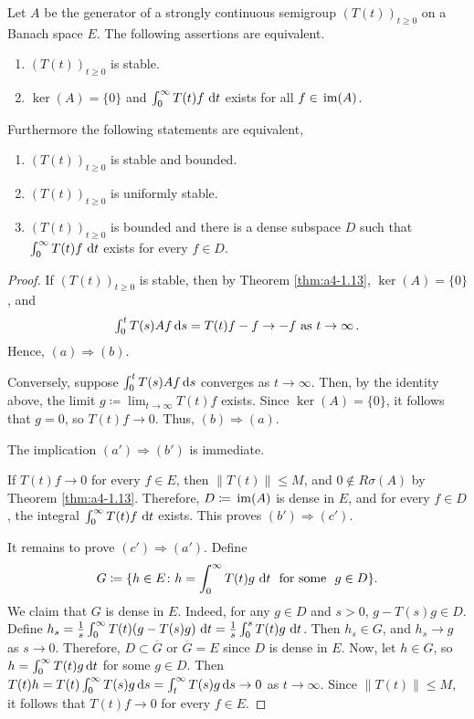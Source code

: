 \begin{theorem}\label{thm:a4-1.16}
Let $A$ be the generator of a strongly continuous semigroup $(T(t))_{t \geq 0}$ on a Banach space $E$. 
The following assertions are equivalent.
\begin{enumerate}[\upshape (a)]
\item 
$(T(t))_{t \geq 0}$ is stable.

\item 
$\ker(A) = \{0\}$ and $\int_{0}^{\infty} T(t)f \,\mathop{}\!\mathrm{d}{t}$ exists for all $f \in \mathop{}\mathrm{im}(A)$.

\end{enumerate}
Furthermore the following statements are equivalent,
\begin{enumerate}[(a')]
\item $(T(t))_{t \geq 0}$ is stable and bounded.
\item $(T(t))_{t \geq 0}$ is uniformly stable.
\item $(T(t))_{t \geq 0}$ is bounded and there is a dense subspace $D$ such that $\int_{0}^{\infty} T(t)f \,\mathop{}\!\mathrm{d}{t}$ exists for every $f \in D$.
\end{enumerate}
\end{theorem}

\begin{proof}
If $(T(t))_{t \geq 0}$ is stable, then by Theorem \ref{thm:a4-1.13}, $\ker(A) = \{0\}$, and
\[\textstyle{
\int_{0}^{t} T(s)Af  \mathop{}\!\mathrm{d}{s}= T(t)f - f \to -f \ \text{as} \ t \to \infty\,.
}\]
Hence, $(a) \Rightarrow (b)$.

Conversely, suppose $\int_{0}^{t} T(s)Af  \mathop{}\!\mathrm{d}{s}$ converges as $t \to \infty$. Then, by
the identity above, the limit $g \coloneqq \lim_{t \to \infty} T(t)f$ exists. 
Since $\ker(A) = \{0\}$, it follows that $g = 0$, so $T(t)f \to 0$. 
Thus, $(b) \Rightarrow (a)$.

The implication $(a') \Rightarrow (b')$ is immediate. 

If $T(t)f \to 0$ for every $f \in E$, then $\|T(t)\| \leq M$, and $0 \not\in R\sigma(A)$ by Theorem \ref{thm:a4-1.13}. 
Therefore,
$D \coloneqq \mathop{}\mathrm{im}(A)$ is dense in $E$, and for every $f \in D$, the integral $\int_{0}^{\infty} T(t)f \,\mathop{}\!\mathrm{d}{t}$ exists. 
This proves $(b') \Rightarrow (c')$. 

It remains to prove $(c') \Rightarrow (a')$.
Define 
\[
G \coloneqq \{h \in E \colon h = \int_{0}^{\infty} T(t)g \,\mathop{}\!\mathrm{d}{t} \ \text{ for some } \ g \in D\}.
\] 
We claim that $G$ is dense in $E$. 
Indeed, for any $g\in D$ and $s>0$,  $g - T(s)g \in D$.
Define $h_{s} = \frac{1}{s} \int_{0}^{\infty} T(t)(g - T(s)g) \,\mathop{}\!\mathrm{d}{t} = \frac{1}{s} \int_{0}^{s} T(t)g \,\mathop{}\!\mathrm{d}{t}$. 
Then $h_{s} \in G$,
and $h_{s} \to g$ as $s \to 0$. 
Therefore, $D \subset \overline{G}$ or $\overline{G} = E$ since $D$ is dense in $E$. 
Now, let $h \in G$, so $h=\int_0^\infty T(t)g\mathop{}\!\mathrm{d}{t}$ for some $g\in D$.
Then $T(t)h = T(t) \int_{0}^{\infty} T(s)g  \mathop{}\!\mathrm{d}{s} = \int_{t}^{\infty} T(s)g  \mathop{}\!\mathrm{d}{s} \to 0$ as $t \to \infty$. 
Since $\|T(t)\| \leq M$, it follows that   $T(t)f \to 0$ for every $f \in E$.
\end{proof}


